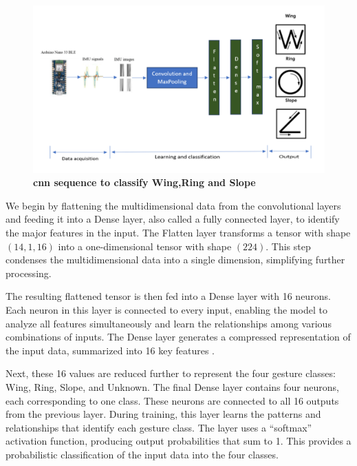 \begin{figure}[H]
	\includegraphics[width=130mm]{Images/KDD/CNNsequence}
	\caption{\textbf{\ac{cnn} sequence to classify Wing,Ring and Slope \cite{Wings:2023}}}
	\label{fig:CNN sequence}
\end{figure}

We begin by flattening the multidimensional data from the convolutional layers and feeding it into a Dense layer, also called a fully connected layer, to identify the major features in the input. The Flatten layer transforms a tensor with shape \( (14, 1, 16) \) into a one-dimensional tensor with shape \( (224) \). This step condenses the multidimensional data into a single dimension, simplifying further processing.

The resulting flattened tensor is then fed into a Dense layer with 16 neurons. Each neuron in this layer is connected to every input, enabling the model to analyze all features simultaneously and learn the relationships among various combinations of inputs. The Dense layer generates a compressed representation of the input data, summarized into 16 key features \cite{Warden:2020}.

Next, these 16 values are reduced further to represent the four gesture classes: Wing, Ring, Slope, and Unknown. The final Dense layer contains four neurons, each corresponding to one class. These neurons are connected to all 16 outputs from the previous layer. During training, this layer learns the patterns and relationships that identify each gesture class. The layer uses a ``softmax'' activation function, producing output probabilities that sum to 1. This provides a probabilistic classification of the input data into the four classes.

